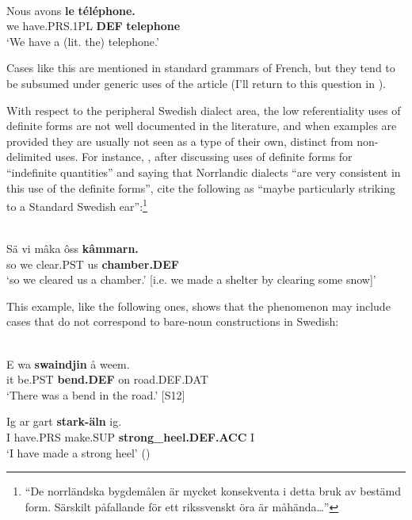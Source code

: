 \ea \label{} 
\\
\gll Nous  avons  \textbf{le} \textbf{téléphone.}\\
we  have.PRS.1PL  \textbf{DEF} \textbf{telephone}\\
\glt ‘We have a (lit. the) telephone.’

\z

Cases like this are mentioned in standard grammars of French, but they tend to be subsumed under generic uses of the article (I’ll return to this question in ). 

With respect to the peripheral Swedish dialect area, the low referentiality uses of definite forms are not well documented in the literature, and when examples are provided they are usually not seen as a type of their own, distinct from non-delimited uses. For instance, \citet[282]{ÅgrenEtAl1954}, after discussing uses of definite forms for “indefinite quantities” and saying that Norrlandic dialects “are very consistent in this use of the definite forms”, cite the following as “maybe particularly striking to a Standard Swedish ear”:\footnote{ “De norrländska bygdemålen är mycket konsekventa i detta bruk av bestämd form. Särskilt påfallande för ett rikssvenskt öra är måhända…”} 

\ea \label{} 
\\
\gll Sä  vi  mâka  ôss  \textbf{kâmmarn.}\\
so  we  clear.PST  us  \textbf{chamber.DEF}\\
\glt ‘so we cleared us a chamber.’ [i.e. we made a shelter by clearing some snow]’

\z

This example, like the following ones, shows that the phenomenon may include cases that do not correspond to bare-noun constructions in Swedish: 

\ea\label{}
\\
\gll E  wa  \textbf{swaindjin} å  weem.\\
it  be.PST  \textbf{bend.DEF} on  road.DEF.DAT\\
\glt ‘There was a bend in the road.’ [S12]

\z

\ea
\gll Ig  ar  gart  \textbf{stark-äln} ig.\\
I   have.PRS  make.SUP  \textbf{strong\_heel.DEF.ACC} I\\
\glt ‘I have made a strong heel’ (\citet[95]{Levander1909})


